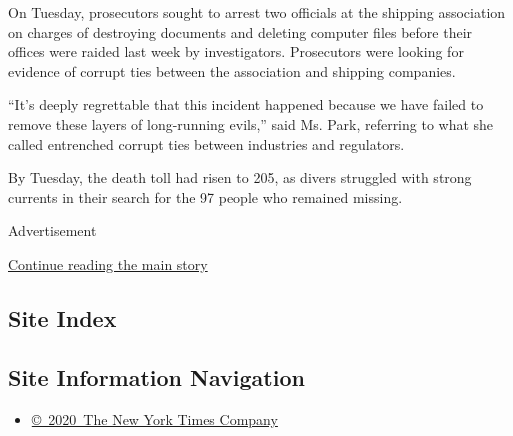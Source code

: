 On Tuesday, prosecutors sought to arrest two officials at the shipping
association on charges of destroying documents and deleting computer
files before their offices were raided last week by investigators.
Prosecutors were looking for evidence of corrupt ties between the
association and shipping companies.

``It's deeply regrettable that this incident happened because we have
failed to remove these layers of long-running evils,'' said Ms. Park,
referring to what she called entrenched corrupt ties between industries
and regulators.

By Tuesday, the death toll had risen to 205, as divers struggled with
strong currents in their search for the 97 people who remained missing.

Advertisement

\protect\hyperlink{after-bottom}{Continue reading the main story}

\hypertarget{site-index}{%
\subsection{Site Index}\label{site-index}}

\hypertarget{site-information-navigation}{%
\subsection{Site Information
Navigation}\label{site-information-navigation}}

\begin{itemize}
\tightlist
\item
  \href{https://help.nytimes3xbfgragh.onion/hc/en-us/articles/115014792127-Copyright-notice}{©~2020~The
  New York Times Company}
\end{itemize}

